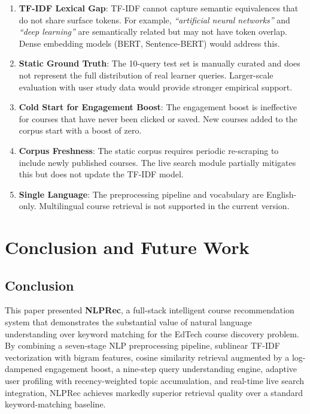 \documentclass[12pt, a4paper]{article}
\begin{document}
\begin{enumerate}[leftmargin=*, label=\arabic*.]
    \item \textbf{TF-IDF Lexical Gap}: TF-IDF cannot capture semantic equivalences that do not
    share surface tokens. For example, \textit{``artificial neural networks''} and
    \textit{``deep learning''} are semantically related but may not have token overlap. Dense
    embedding models (BERT, Sentence-BERT) would address this.
    
    \item \textbf{Static Ground Truth}: The 10-query test set is manually curated and does not
    represent the full distribution of real learner queries. Larger-scale evaluation with user
    study data would provide stronger empirical support.
    
    \item \textbf{Cold Start for Engagement Boost}: The engagement boost is ineffective for
    courses that have never been clicked or saved. New courses added to the corpus start with
    a boost of zero.
    
    \item \textbf{Corpus Freshness}: The static corpus requires periodic re-scraping to include
    newly published courses. The live search module partially mitigates this but does not update
    the TF-IDF model.
    
    \item \textbf{Single Language}: The preprocessing pipeline and vocabulary are English-only.
    Multilingual course retrieval is not supported in the current version.
\end{enumerate}

\section{Conclusion and Future Work}
\label{sec:conclusion}

\subsection{Conclusion}

This paper presented \textbf{NLPRec}, a full-stack intelligent course recommendation system
that demonstrates the substantial value of natural language understanding over keyword matching
for the EdTech course discovery problem. By combining a seven-stage NLP preprocessing pipeline,
sublinear TF-IDF vectorization with bigram features, cosine similarity retrieval augmented by
a log-dampened engagement boost, a nine-step query understanding engine, adaptive user profiling
with recency-weighted topic accumulation, and real-time live search integration, NLPRec achieves
markedly superior retrieval quality over a standard keyword-matching baseline.
\end{document}

